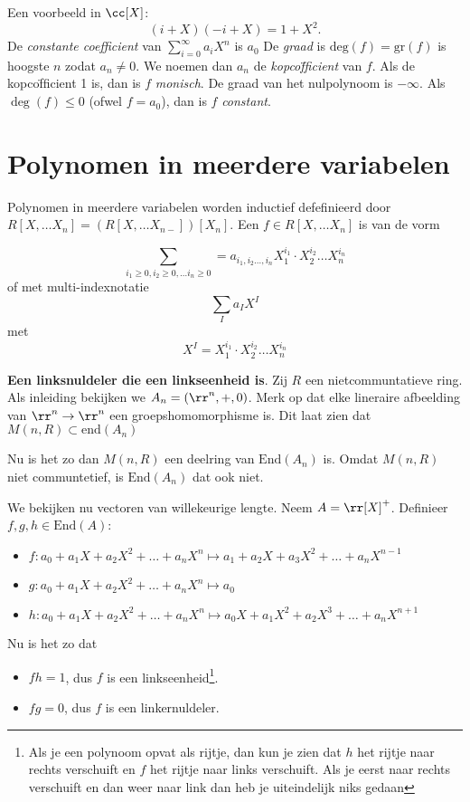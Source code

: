 \documentclass[a4paper,12pt,oneside]{book}
\begin{document}
Een voorbeeld in $\cc[X]$:
\[
(i+X)(-i+X) = 1 + X^2.
\]
De \textit{constante coefficient} van $\sum_{i=0}^{\infty}a_iX^n$ is $a_0$
De \textit{graad} is $\mathrm{deg}(f) = \mathrm{gr}(f)$ is hoogste $n$ zodat $a_n \ne 0$. We noemen dan $a_n$ de \textit{kopco\"fficient} van $f$. Als de kopco\"fficient 1 is, dan is $f$ \textit{monisch}. De graad van het nulpolynoom is $-\infty$. Als $\deg(f) \le 0$ (ofwel $f= a_0$), dan is $f$ \textit{constant}.

\section{Polynomen in meerdere variabelen}
Polynomen in meerdere variabelen worden inductief defefinieerd door
$R[X,\ldots X_n] = (R[X,\ldots X_{n-}])[X_n]$. Een $f\in R[X,\ldots X_n]$ is  van de vorm

\[
\sum_{i_1 \ge 0, i_2 \ge 0, \ldots i_n \ge 0} = a_{i_1,i_2 \ldots, i_n} X_1^{i_1} \cdot X_2^{i_2} \ldots X_n^{i_n}
\]
of met multi-indexnotatie
\[
\sum_{I} a_IX^I
\]
met 
\[
X^I = X_1^{i_1} \cdot X_2^{i_2} \ldots X_n^{i_n}
\]
\begin{example}
\textbf{Een linksnuldeler die een linkseenheid is}. Zij $R$ een nietcommuntatieve ring.
Als inleiding bekijken we $A_n = (\rr^n, +, 0)$. Merk op dat elke lineraire afbeelding van $\rr^n \to \rr^n$ een groepshomomorphisme is. Dit laat zien dat $M(n,R) \subset \mathrm{end}(A_n)$

Nu is het zo dan $M(n,R)$ een deelring van $\mathrm{End}(A_n)$ is. Omdat $M(n,R)$ niet communtetief, is $\mathrm{End}(A_n)$ dat ook niet.

We bekijken nu vectoren van willekeurige lengte. Neem $A = \rr[X]^{+}$. Definieer $f,g,h \in \mathrm{End}(A)$:
\begin{itemize}
\item $f : a_0 +a_1 X + a_2X^2 + \ldots + a_nX^n \mapsto a_1 +a_2 X + a_3X^2 + \ldots + a_nX^{n-1} $
\item $g : a_0 +a_1 X + a_2X^2 + \ldots + a_nX^n \mapsto a_0$
\item $h : a_0 +a_1 X + a_2X^2 + \ldots + a_nX^n \mapsto a_0X +a_1 X^2 + a_2X^3 + \ldots + a_nX^{n+1}$
\end{itemize}
Nu is het zo dat 
\begin{itemize}
\item $fh = 1$, dus $f$ is een linkseenheid\footnote{Als je een polynoom opvat als rijtje, dan kun je zien dat $h$ het rijtje naar rechts verschuift en $f$ het rijtje naar links verschuift. Als je eerst naar rechts verschuift en dan weer naar link dan heb je uiteindelijk niks gedaan}.
\item $fg = 0$, dus $f$ is een linkernuldeler.
\end{itemize}
\end{example}
\end{document}
